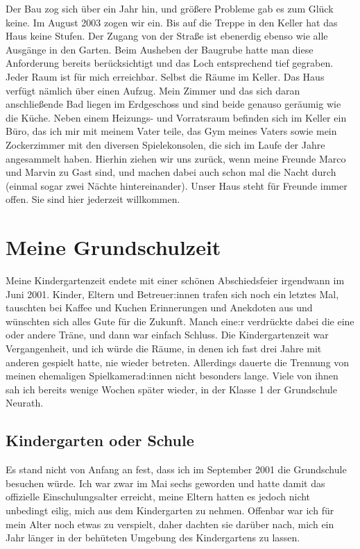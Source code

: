 \documentclass[fontsize=14pt,a4paper,headinclude,DIV=calc,automark]{scrbook}
\begin{document}
Der Bau zog sich über ein Jahr hin, und größere Probleme gab es zum Glück keine. Im August 2003 zogen wir ein. Bis auf die Treppe in den Keller hat das Haus keine Stufen. Der Zugang von der Straße ist ebenerdig ebenso wie alle Ausgänge in den Garten. Beim Ausheben der Baugrube hatte man diese Anforderung bereits berücksichtigt und das Loch entsprechend tief gegraben. Jeder Raum ist für mich erreichbar. Selbst die Räume im Keller. Das Haus verfügt nämlich über einen Aufzug. Mein Zimmer und das sich daran anschließende Bad liegen im Erdgeschoss und sind beide genauso geräumig wie die Küche. Neben einem Heizungs- und Vorratsraum befinden sich im Keller ein Büro, das ich mir mit meinem Vater teile, das Gym meines Vaters sowie mein Zockerzimmer mit den diversen Spielekonsolen, die sich im Laufe der Jahre angesammelt haben. Hierhin ziehen wir uns zurück, wenn meine Freunde Marco und Marvin zu Gast sind, und machen dabei auch schon mal die Nacht durch (einmal sogar zwei Nächte hintereinander). Unser Haus steht für Freunde immer offen. Sie sind hier jederzeit willkommen.

\thispagestyle{scrheadings} %
\leavevmode
\normalsize

 \section{Meine Grundschulzeit}

Meine Kindergartenzeit endete mit einer schönen Abschiedsfeier irgendwann im Juni 2001. Kinder, Eltern und Betreuer:innen trafen sich noch ein letztes Mal, tauschten bei Kaffee und Kuchen Erinnerungen und Anekdoten aus und wünschten sich alles Gute für die Zukunft. Manch eine:r verdrückte dabei die eine oder andere Träne, und dann war einfach Schluss. Die Kindergartenzeit war Vergangenheit, und ich würde die Räume, in denen ich fast drei Jahre mit anderen gespielt hatte, nie wieder betreten. Allerdings dauerte die Trennung von meinen ehemaligen Spielkamerad:innen nicht besonders lange. Viele von ihnen sah ich bereits wenige Wochen später wieder, in der Klasse 1 der Grundschule Neurath.

\subsection{Kindergarten oder Schule}

Es stand nicht von Anfang an fest, dass ich im September 2001 die Grundschule besuchen würde. Ich war zwar im Mai sechs geworden und hatte damit das offizielle Einschulungsalter erreicht, meine Eltern hatten es jedoch nicht unbedingt eilig, mich aus dem Kindergarten zu nehmen. Offenbar war ich für mein Alter noch etwas zu verspielt, daher dachten sie darüber nach, mich ein Jahr länger in der behüteten Umgebung des Kindergartens zu lassen.
\end{document}
